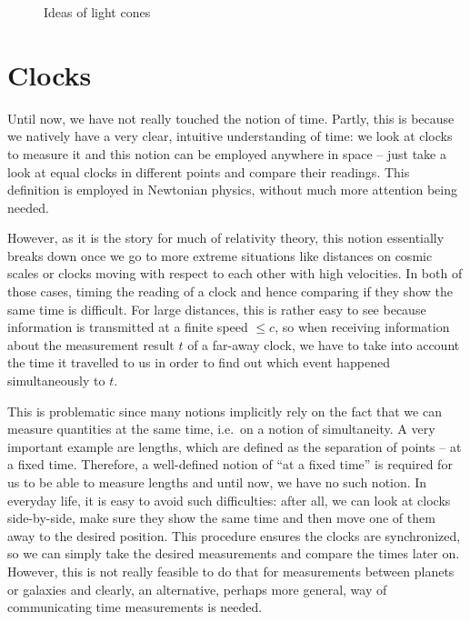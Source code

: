 \begin{figure}
\centering


\caption{Ideas of light cones}
\end{figure}



\newpage



	\section{Clocks}\label{sec:clocks}
Until now, we have not really touched the notion of time. Partly, this is because we natively have a very clear, intuitive understanding of time: we look at clocks to measure it and this notion can be employed anywhere in space -- just take a look at equal clocks in different points and compare their readings. This definition is employed in Newtonian physics, without much more attention being needed.


However, as it is the story for much of relativity theory, this notion essentially breaks down once we go to more extreme situations like distances on cosmic scales or clocks moving with respect to each other with high velocities. In both of those cases, timing the reading of a clock and hence comparing if they show the same time is difficult. For large distances, this is rather easy to see because information is transmitted at a finite speed $\leq c$, so when receiving information about the measurement result $t$ of a far-away clock, we have to take into account the time it travelled to us in order to find out which event happened simultaneously to $t$.

This is problematic since many notions implicitly rely on the fact that we can measure quantities at the same time, i.e.~on a notion of simultaneity. A very important example are lengths, which are defined as the separation of points -- at a fixed time. Therefore, a well-defined notion of \enquote{at a fixed time} is required for us to be able to measure lengths and until now, we have no such notion. In everyday life, it is easy to avoid such difficulties: after all, we can look at clocks side-by-side, make sure they show the same time and then move one of them away to the desired position. This procedure ensures the clocks are synchronized, so we can simply take the desired measurements and compare the times later on. However, this is not really feasible to do that for measurements between planets or galaxies and clearly, an alternative, perhaps more general, way of communicating time measurements is needed.


